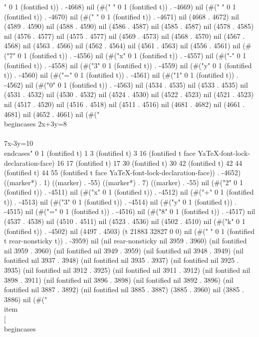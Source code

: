 " 0 1 (fontified t)) . -4668) nil (#("	" 0 1 (fontified t)) . -4669) nil (#("	" 0 1 (fontified t)) . -4670) nil (#(" " 0 1 (fontified t)) . -4671) nil (4668 . 4672) nil (4589 . 4590) nil (4588 . 4590) nil (4586 . 4587) nil (4585 . 4587) nil (4578 . 4585) nil (4576 . 4577) nil (4575 . 4577) nil (4569 . 4573) nil (4568 . 4570) nil (4567 . 4568) nil (4563 . 4566) nil (4562 . 4564) nil (4561 . 4563) nil (4556 . 4561) nil (#("7" 0 1 (fontified t)) . -4556) nil (#("x" 0 1 (fontified t)) . -4557) nil (#("-" 0 1 (fontified t)) . -4558) nil (#("3" 0 1 (fontified t)) . -4559) nil (#("y" 0 1 (fontified t)) . -4560) nil (#("=" 0 1 (fontified t)) . -4561) nil (#("1" 0 1 (fontified t)) . -4562) nil (#("0" 0 1 (fontified t)) . -4563) nil (4534 . 4535) nil (4533 . 4535) nil (4531 . 4532) nil (4530 . 4532) nil (4524 . 4530) nil (4522 . 4523) nil (4521 . 4523) nil (4517 . 4520) nil (4516 . 4518) nil (4511 . 4516) nil (4681 . 4682) nil (4661 . 4681) nil (4652 . 4661) nil (#("
		\\begin{cases}
		 2x+3y=8\\\\
		 7x-3y=10
		\\end{cases}" 0 1 (fontified t) 1 3 (fontified t) 3 16 (fontified t face YaTeX-font-lock-declaration-face) 16 17 (fontified t) 17 30 (fontified t) 30 42 (fontified t) 42 44 (fontified t) 44 55 (fontified t face YaTeX-font-lock-declaration-face)) . -4652) ((marker*) . 1) ((marker) . -55) ((marker*) . 7) ((marker) . -55) nil (#("2" 0 1 (fontified t)) . -4511) nil (#("x" 0 1 (fontified t)) . -4512) nil (#("+" 0 1 (fontified t)) . -4513) nil (#("3" 0 1 (fontified t)) . -4514) nil (#("y" 0 1 (fontified t)) . -4515) nil (#("=" 0 1 (fontified t)) . -4516) nil (#("8" 0 1 (fontified t)) . -4517) nil (4537 . 4538) nil (4510 . 4511) nil (4523 . 4536) nil (4502 . 4510) nil (#("k" 0 1 (fontified t)) . -4502) nil (4497 . 4503) (t 21883 32827 0 0) nil (#("
" 0 1 (fontified t rear-nonsticky t)) . -3959) nil (nil rear-nonsticky nil 3959 . 3960) (nil fontified nil 3959 . 3960) (nil fontified nil 3949 . 3959) (nil fontified nil 3948 . 3949) (nil fontified nil 3937 . 3948) (nil fontified nil 3935 . 3937) (nil fontified nil 3925 . 3935) (nil fontified nil 3912 . 3925) (nil fontified nil 3911 . 3912) (nil fontified nil 3898 . 3911) (nil fontified nil 3896 . 3898) (nil fontified nil 3892 . 3896) (nil fontified nil 3887 . 3892) (nil fontified nil 3885 . 3887) (3885 . 3960) nil (3885 . 3886) nil (#("	 \\item \\[
		\\begin{cases}
